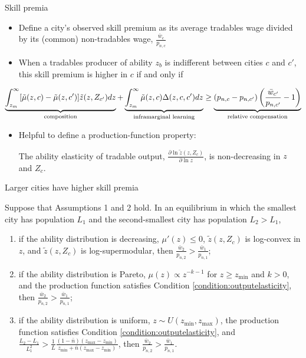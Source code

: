 \documentclass[11pt,notes=hide,aspectratio=169]{beamer}
\begin{document}
\begin{frame}{Skill premia}
\begin{itemize}
	\item Define a city's observed skill premium as its average tradables wage divided by its (common) non-tradables wage, $\frac{\bar{w}_{c}}{p_{n,c}}$
	\item When a tradables producer of ability $z_b$ is indifferent between cities $c$ and $c'$, this skill premium is higher in $c$ if and only if
\end{itemize}
\begin{equation*} %
\underbrace{\int_{z_m}^{\infty}[\tilde{\mu}(z,c)-\tilde{\mu}(z,c')]\tilde{z}(z,Z_{c'})dz}_{\textnormal{composition}}
+\underbrace{\int_{z_m}^{\infty}\tilde{\mu}(z,c)\Delta(z,c,c')dz}_{\textnormal{inframarginal learning}}
\geq \underbrace{\left(p_{n,c}-p_{n,c'}\right)\left(\frac{\bar{w}_{c'}}{p_{n,c'}}-1\right)}_{\textnormal{relative compensation}}\label{eqn:premia_decomp}
\end{equation*}
\begin{itemize}
	\item Helpful to define a production-function property: 
	\begin{condition}\label{condition:outputelasticity}
	The ability elasticity of tradable output,
	$\frac{\partial\ln\tilde{z}\left(z,Z_{c}\right)}{\partial\ln z}$,
	is non-decreasing in $z$ and $Z_{c}$.
	\end{condition}
\end{itemize}
\end{frame}
\begin{frame}{Larger cities have higher skill premia}
\begin{proposition} \label{prop:skillpremia}
Suppose that Assumptions 1 and 2 hold.
In an equilibrium in which the smallest city has population $L_{1}$ and the second-smallest city has population $L_{2}>L_{1}$,
\begin{enumerate}
\item if the ability distribution is decreasing, $\mu'(z)\leq0$, $\tilde{z}(z,Z_{c})$ is log-convex in $z$, and $\tilde{z}(z,Z_{c})$ is log-supermodular, then $\frac{\bar{w}_{2}}{p_{n,2}}>\frac{\bar{w}_{1}}{p_{n,1}}$;
\item if the ability distribution is Pareto, $\mu(z)\propto z^{-k-1}$ for $z\geq z_{\min}$ and $k>0$, and the production function satisfies Condition \ref{condition:outputelasticity}, then $\frac{\bar{w}_{2}}{p_{n,2}}>\frac{\bar{w}_{1}}{p_{n,1}}$;
\item if the ability distribution is uniform, $z\sim U\left(z_{\min},z_{\max}\right)$, the production function satisfies Condition \ref{condition:outputelasticity}, and $\frac{L_2 - L_1}{L_1^2} > \frac{1}{L}\frac{(1-\bar{n})(z_{\max} - z_{\min})}{z_{\min} +\bar{n}(z_{\max} - z_{\min})}$, then $\frac{\bar{w}_{2}}{p_{n,2}}>\frac{\bar{w}_{1}}{p_{n,1}}$.
\end{enumerate}
\end{proposition}
\end{frame}
\end{document}
